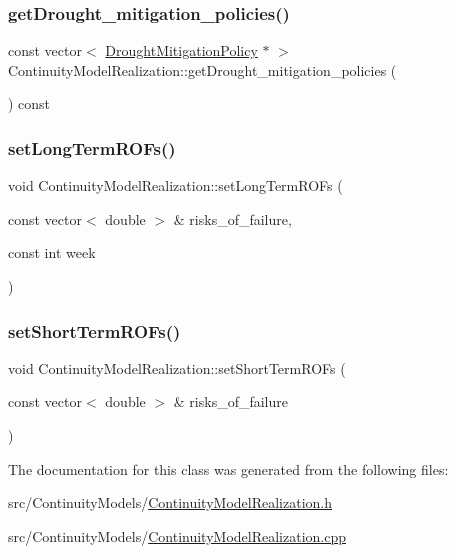 \subsubsection{\texorpdfstring{get\+Drought\+\_\+mitigation\+\_\+policies()}{getDrought\_mitigation\_policies()}}
{\footnotesize\ttfamily const vector$<$ \mbox{\hyperlink{classDroughtMitigationPolicy}{Drought\+Mitigation\+Policy}} $\ast$ $>$ Continuity\+Model\+Realization\+::get\+Drought\+\_\+mitigation\+\_\+policies (\begin{DoxyParamCaption}{ }\end{DoxyParamCaption}) const}

\mbox{\label{classContinuityModelRealization_a45cde9269efee4dc94f4905769983c9f}} 
\subsubsection{\texorpdfstring{set\+Long\+Term\+R\+O\+Fs()}{setLongTermROFs()}}
{\footnotesize\ttfamily void Continuity\+Model\+Realization\+::set\+Long\+Term\+R\+O\+Fs (\begin{DoxyParamCaption}\item[{const vector$<$ double $>$ \&}]{risks\+\_\+of\+\_\+failure,  }\item[{const int}]{week }\end{DoxyParamCaption})}

\mbox{\label{classContinuityModelRealization_a2db1784f020ed147335894022e20e457}} 
\subsubsection{\texorpdfstring{set\+Short\+Term\+R\+O\+Fs()}{setShortTermROFs()}}
{\footnotesize\ttfamily void Continuity\+Model\+Realization\+::set\+Short\+Term\+R\+O\+Fs (\begin{DoxyParamCaption}\item[{const vector$<$ double $>$ \&}]{risks\+\_\+of\+\_\+failure }\end{DoxyParamCaption})}



The documentation for this class was generated from the following files\+:\begin{DoxyCompactItemize}
\item 
src/\+Continuity\+Models/\mbox{\hyperlink{ContinuityModelRealization_8h}{Continuity\+Model\+Realization.\+h}}\item 
src/\+Continuity\+Models/\mbox{\hyperlink{ContinuityModelRealization_8cpp}{Continuity\+Model\+Realization.\+cpp}}\end{DoxyCompactItemize}
